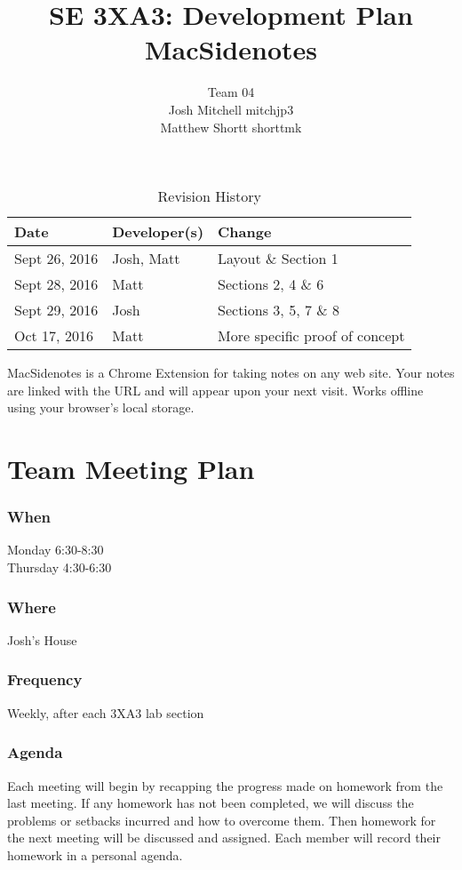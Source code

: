 \documentclass{article}
\title{SE 3XA3: Development Plan\\MacSidenotes}
\author{Team 04
	\\ Josh Mitchell mitchjp3
	\\ Matthew Shortt shorttmk
}
\date{}
\begin{document}
	
	\begin{table}[hp]
		\caption{Revision History} \label{TblRevisionHistory}
		\begin{tabularx}{\textwidth}{llX}
			\toprule
			\textbf{Date} & \textbf{Developer(s)} & \textbf{Change}\\
			\midrule
			Sept 26, 2016 & Josh, Matt & Layout \& Section 1\\
			Sept 28, 2016 & Matt & Sections 2, 4 \& 6\\
			Sept 29, 2016 & Josh & Sections 3, 5, 7 \& 8\\
			Oct 17, 2016 & Matt & More specific proof of concept\\
			\bottomrule
		\end{tabularx}
	\end{table}
	
	\newpage
	
	\maketitle
	
	MacSidenotes is a Chrome Extension for taking notes on any web site. Your 
	notes are linked with the URL and will appear upon your next visit. Works 
	offline using your browser's local storage.
	
	\section{Team Meeting Plan}
	\subsubsection*{When}
	Monday 6:30-8:30 \\
	Thursday 4:30-6:30
	\subsubsection*{Where}
	Josh's House
	\subsubsection*{Frequency}
	Weekly, after each 3XA3 lab section
	\subsubsection*{Agenda}
	Each meeting will begin by recapping the progress made on homework from the 
	last meeting. If any homework has not been completed, we will discuss the 
	problems or setbacks incurred and how to overcome them. Then homework for 
	the next meeting will be discussed and assigned. Each member will record 
	their 
	homework in a personal agenda.
	
\end{document}
